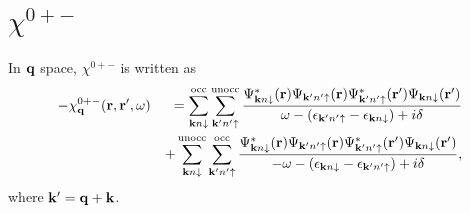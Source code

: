 \documentclass[a4paper,10pt,epsf,fleqn]{article}
\newcommand{\bfq}{{\bf q}}
\newcommand{\bfk}{{\bf k}}
\newcommand{\bfr}{{\bf r}}
\newcommand{\ispone}{\downarrow}
\newcommand{\isptwo}{\uparrow}
\begin{document}
{{{\begin{enumerate}
\end{enumerate}


\section{$\chi^{0+-}$}
In $\bfq$ space, $\chi^{0+-}$ is written as
\begin{eqnarray}
- \chi^{0+-}_\bfq(\bfr,\bfr',\omega) 
&&=
 \sum^{\rm  occ}_{\bfk n \ispone} \sum^{\rm unocc}_{\bfk' n'\isptwo}
\frac{
\Psi_{\bfk n\ispone}^*(\bfr)      \Psi_{\bfk' n'\isptwo}(\bfr)
\Psi_{\bfk' n'\isptwo}^*(\bfr') \Psi_{\bfk n\ispone}(\bfr') 
}{\omega-(\epsilon_{\bfk' n'\isptwo}-\epsilon_{\bfk n\ispone})+i \delta} \nonumber\\
&&+ \sum^{\rm  unocc}_{\bfk n \ispone} \sum^{\rm occ}_{\bfk' n'\isptwo}
\frac{
\Psi_{\bfk n\ispone}^*(\bfr)      \Psi_{\bfk' n'\isptwo}(\bfr)
\Psi_{\bfk' n'\isptwo}^*(\bfr') \Psi_{\bfk n\ispone}(\bfr') 
}{-\omega-(\epsilon_{\bfk n\ispone}-\epsilon_{\bfk' n'\isptwo})+i \delta},
\label{generalchi01q}
\end{eqnarray}
where $\bfk' = \bfq+ \bfk$. 

}}}
\end{document}
